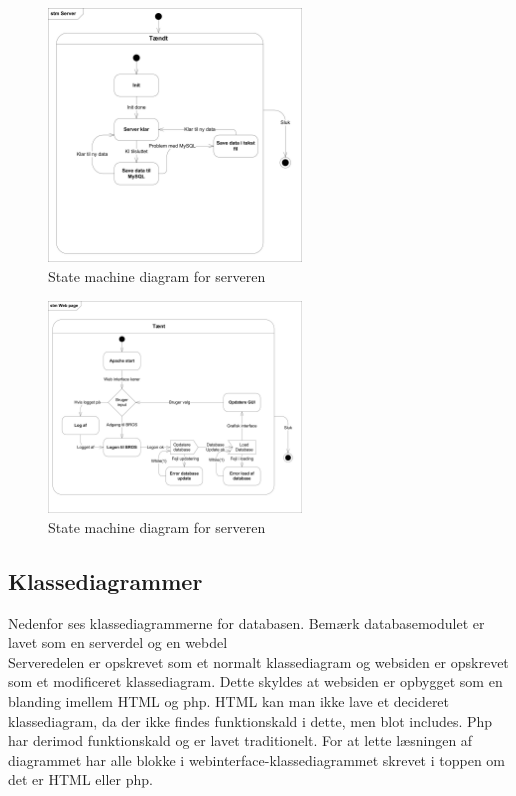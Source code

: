 \begin{figure}[H]
	\centering
	\includegraphics[width=0.6\textwidth]{billeder/Database/stm_server}
	\caption{State machine diagram for serveren}
	\label{fig:stm_server}
\end{figure}

\begin{figure}[H]
	\centering
	\includegraphics[width=0.6\textwidth]{billeder/Database/stm_web}
	\caption{State machine diagram for serveren}
	\label{fig:stm_web}
\end{figure}

\subsection{Klassediagrammer}
Nedenfor ses klassediagrammerne for databasen. Bemærk databasemodulet er lavet som en serverdel og en webdel\\
Serveredelen er opskrevet som et normalt klassediagram og websiden er opskrevet som et modificeret klassediagram. Dette skyldes at websiden er opbygget som en blanding imellem HTML og php. HTML kan man ikke lave et decideret klassediagram, da der ikke findes funktionskald i dette, men blot includes. Php har derimod funktionskald og er lavet traditionelt. For at lette læsningen af diagrammet har alle blokke i webinterface-klassediagrammet skrevet i toppen om det er HTML eller php.


